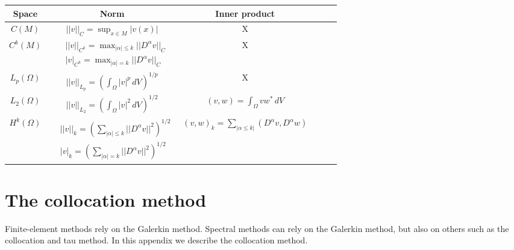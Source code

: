 \documentclass[oneside,a4paper,11pt]{report}
\begin{document}
\setlength{\cellspacetoplimit}{3pt}
\setlength{\cellspacebottomlimit}{3pt}

\begin{center}
\begin{tabular}{Sc|Sc|Sc}
    Space & Norm & Inner product \\
    \hline
    $C(M)$ & $ \displaystyle ||v||_C = \sup_{x \in M} |v(x)| $ & X \\
    \hline
    $C^k(M)$ & $\begin{aligned} &||v||_{C^k} = \max_{|\alpha| \le k} ||D^\alpha v||_C \\ &|v|_{C^k}=\max_{|\alpha| = k} ||D^\alpha v||_C \end{aligned}$ & X \\
    \hline
    $L_p(\Omega)$ & $ \displaystyle ||v||_{L_p} = \left ( \int_\Omega |v|^p \, dV \right)^{1/p} $ & X \\
    \hline
    $L_2(\Omega)$ & $ \displaystyle ||v||_{L_2} = \left ( \int_\Omega |v|^2 \, dV \right)^{1/2} $ & $ \displaystyle (v,w) = \int_\Omega vw^* \, dV $ \\
    \hline
    $H^k(\Omega)$ & $ \begin{aligned} &||v||_k = \left ( \sum_{|\alpha| \le k} ||D^\alpha v||^2 \right )^{1/2} \\ &|v|_k = \left ( \sum_{|\alpha| = k} ||D^\alpha v||^2 \right )^{1/2} \end{aligned}$ & $ \displaystyle (v,w)_k = \sum_{|\alpha \le k|} (D^\alpha v, D^\alpha w) $
\end{tabular}
\end{center}

\chapter{The collocation method}
\label{sec:collocation_method}
Finite-element methods rely on the Galerkin method. Spectral methods can rely on the Galerkin method, but also on others such as the collocation and tau method. In this appendix we describe the collocation method.
\end{document}
